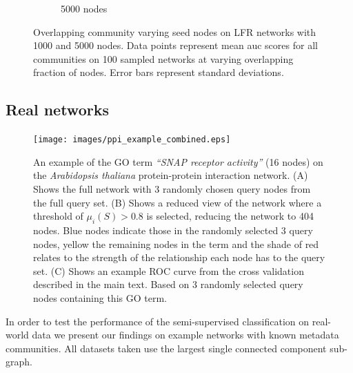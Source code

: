 \documentclass[sigconf]{acmart}
\begin{document}
\begin{figure}[t]
\begin{subfigure}[b]{0.23\textwidth}
        \caption{5000 nodes}
    \end{subfigure}
    \caption{Overlapping community varying seed nodes on LFR networks with 1000 and 5000 nodes.
     Data points represent mean auc scores for all communities on 100 sampled networks at varying overlapping fraction of nodes.
     Error bars represent standard deviations.}
     \label{fig:auc_overlap}
\end{figure}


\subsection{Real networks}

\begin{figure}[t]
\texttt{[image: images/ppi\_example\_combined.eps]}
\caption{An example of the GO term \textit{``SNAP receptor activity''} (16 nodes) on the \textit{Arabidopsis thaliana} protein-protein interaction network.
(A) Shows the full network with 3 randomly chosen query nodes from the full query set.
(B) Shows a reduced view of the network where a threshold of $\mu_i(S) > 0.8$ is selected, reducing the network to 404 nodes.
Blue nodes indicate those in the randomly selected 3 query nodes, yellow the remaining nodes in the term and the shade of red relates to the strength of the relationship each node has to the query set.
(C) Shows an example ROC curve from the cross validation described in the main text. 
Based on 3 randomly selected query nodes containing this GO term.
}
\label{fig:query_example}
\end{figure}

In order to test the performance of the semi-supervised classification on real-world data we present our findings on example networks with known metadata communities.
All datasets taken use the largest single connected component sub-graph.
\end{document}

